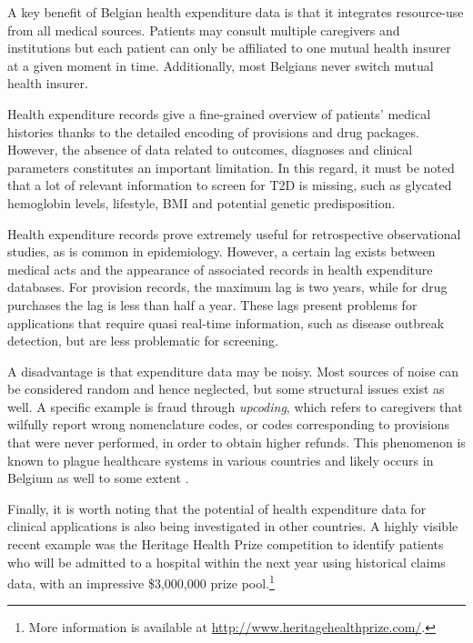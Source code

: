 A key benefit of Belgian health expenditure data is that it integrates resource-use from all medical sources. Patients may consult multiple caregivers and institutions but each patient can only be affiliated to one mutual health insurer at a given moment in time. Additionally, most Belgians never switch mutual health insurer.

Health expenditure records give a fine-grained overview of patients' medical histories thanks to the detailed encoding of provisions and drug packages. However, the absence of data related to outcomes, diagnoses and clinical parameters constitutes an important limitation. In this regard, it must be noted that a lot of relevant information to screen for T2D is missing, such as glycated hemoglobin levels, lifestyle, BMI and potential genetic predisposition.

Health expenditure records prove extremely useful for retrospective observational studies, as is common in epidemiology. However, a certain lag exists between medical acts  and the appearance of associated records in health expenditure databases. For provision records, the maximum lag is two years, while for drug purchases the lag is less than half a year. These lags present problems for applications that require quasi real-time information, such as disease outbreak detection, but are less problematic for screening.

A disadvantage is that expenditure data may be noisy. Most sources of noise can be considered random and hence neglected, but some structural issues exist as well. A specific example is fraud through \emph{upcoding}, which refers to caregivers that wilfully report wrong nomenclature codes, or codes corresponding to provisions that were never performed, in order to obtain higher refunds. This phenomenon is known to plague healthcare systems in various countries and likely occurs in Belgium as well to some extent \citep{silverman2004medicare,steinbusch2007risk,berta2010effects}.

Finally, it is worth noting that the potential of health expenditure data for clinical applications is also being investigated in other countries. A highly visible recent example was the Heritage Health Prize competition to identify patients who will be admitted to a hospital within the next year using historical claims data, with an impressive \$3,000,000 prize pool.\footnote{More information is available at \url{http://www.heritagehealthprize.com/}.}
